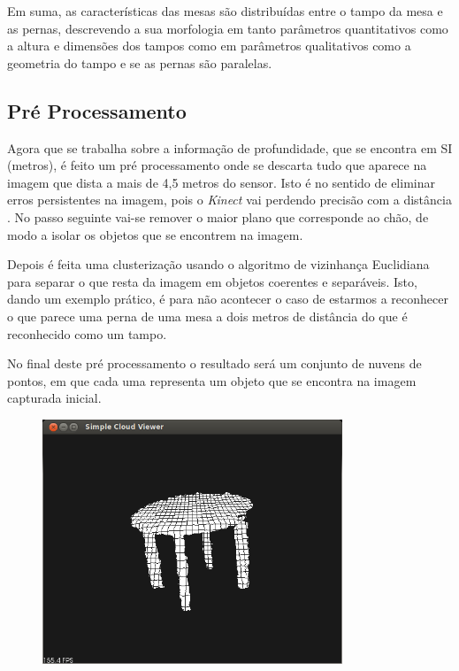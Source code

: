 Em suma, as características das mesas são distribuídas entre o tampo da mesa e as pernas, descrevendo a sua morfologia em tanto parâmetros quantitativos como a altura e dimensões dos tampos como em parâmetros qualitativos como a geometria do tampo e se as pernas são paralelas.


\subsection{Pré Processamento}

Agora que se trabalha sobre a informação de profundidade, que se encontra em SI (metros), é feito um pré processamento onde se descarta tudo que aparece na imagem que dista a mais de 4,5 metros do sensor. Isto é no sentido de eliminar erros persistentes na imagem, pois o \emph{Kinect} vai perdendo precisão com a distância \cite{s120201437}. No passo seguinte vai-se remover o maior plano que corresponde ao chão, de modo a isolar os objetos que se encontrem na imagem.


Depois é feita uma clusterização usando o algoritmo de vizinhança Euclidiana para separar o que resta da imagem em objetos coerentes e separáveis. Isto, dando um exemplo prático, é para não acontecer o caso de estarmos a reconhecer o que parece uma perna de uma mesa a dois metros de distância do que é reconhecido como um tampo.

No final deste pré processamento o resultado será um conjunto de nuvens de pontos, em que cada uma representa um objeto que se encontra na imagem capturada inicial.

\begin{figure}[htb]
\begin{center}
	\includegraphics[width=0.80\textwidth]{figures/mesa1_1.png}
	\label{fig:exemplo_processado}
\end{center}
\end{figure}

